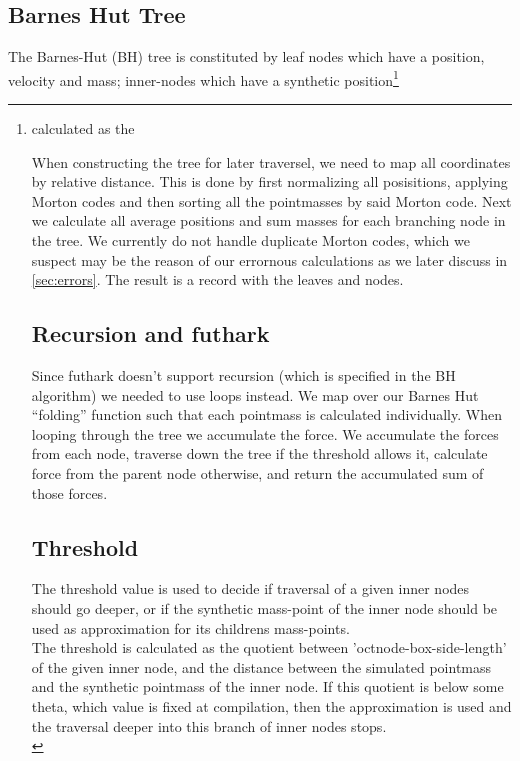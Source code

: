 \subsection{Barnes Hut Tree}
The Barnes-Hut (BH) tree is constituted by leaf nodes which have a position, velocity and mass; inner-nodes which have a synthetic position\footnote{calculated as the  


When constructing the tree for later traversel, we need to map all coordinates
by relative distance. This is done by first normalizing all posisitions,
applying Morton codes and then sorting all the pointmasses by said Morton code.
Next we calculate all average positions and sum masses for each branching node
in the tree. We currently do not handle duplicate Morton codes, which we suspect
may be the reason of our errornous calculations as we later discuss in
\autoref{sec:errors}. The result is a record with the leaves and nodes.

\subsection{Recursion and futhark}
Since futhark doesn't support recursion (which is specified in the BH algorithm)
we needed to use loops instead. We map over our Barnes Hut ``folding'' function
such that each pointmass is calculated individually. When looping through the
tree we accumulate the force. We accumulate the forces from each node, traverse
down the tree if the threshold allows it, calculate force from the parent node
otherwise, and return the accumulated sum of those forces.

\subsection{Threshold}
The threshold value is used to decide if traversal of a given inner nodes should go
deeper, or if the synthetic mass-point of the inner node should be used as
approximation for its childrens mass-points. \\


The threshold is calculated as the quotient between 'octnode-box-side-length' of
the given inner node, and the distance between the simulated pointmass and the
synthetic pointmass of the inner node. If this quotient is below some theta,
which value is fixed at compilation, then the approximation is used and the
traversal deeper into this branch of inner nodes stops. \\

}
